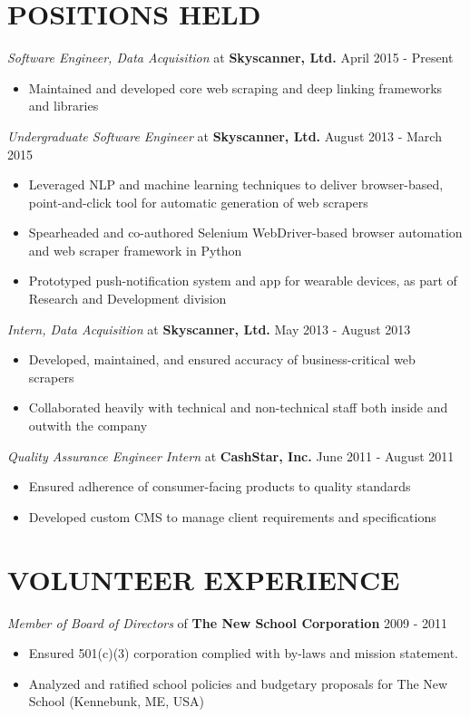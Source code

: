 \documentclass[line, margin]{res}
\begin{document}
\begin{resume}
\section{POSITIONS HELD}
\textit{Software Engineer, Data Acquisition} at \textbf{Skyscanner, Ltd.} \hfill April 2015 - Present
\begin{itemize}[leftmargin=10pt]
\item Maintained and developed core web scraping and deep linking frameworks and libraries
\end{itemize}
\textit{Undergraduate Software Engineer} at \textbf{Skyscanner, Ltd.} \hfill August 2013 - March 2015 
\begin{itemize}[leftmargin=10pt]
\item Leveraged NLP and machine learning techniques to deliver browser-based, point-and-click tool for automatic generation of web scrapers
\item Spearheaded and co-authored Selenium WebDriver-based browser automation and web scraper framework in Python
\item Prototyped push-notification system and app for wearable devices, as part of Research and Development division
\end{itemize}
\textit{Intern, Data Acquisition} at \textbf{Skyscanner, Ltd.} \hfill May 2013 - August 2013
\begin{itemize}[leftmargin=10pt]
\item Developed, maintained, and ensured accuracy of business-critical web scrapers
\item Collaborated heavily with technical and non-technical staff both inside and outwith the company
\end{itemize}
\textit{Quality Assurance Engineer Intern} at \textbf{CashStar, Inc.} \hfill June 2011 - August 2011
\begin{itemize}[leftmargin=10pt]
\item Ensured adherence of consumer-facing products to quality standards
\item Developed custom CMS to manage client requirements and specifications
\end{itemize}

\section{VOLUNTEER EXPERIENCE}
\textit{Member of Board of Directors} of \textbf{The New School Corporation} \hfill 2009 - 2011
\begin{itemize}[leftmargin=10pt]
\item Ensured 501(c)(3) corporation complied with by-laws and mission statement.
\item Analyzed and ratified school policies and budgetary proposals for The New School (Kennebunk, ME, USA)
\end{itemize}


\end{resume}
\end{document}
